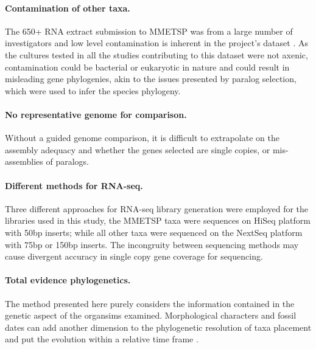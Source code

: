\documentclass[12pt]{article}
\begin{document}
\paragraph*{Contamination of other taxa.} 
The 650+ RNA extract submission to MMETSP was from a large number of investigators and low level contamination is inherent in the project's dataset \cite{keeling2014marine}. 
As the cultures tested in all the studies contributing to this dataset were not axenic, contamination could be bacterial or eukaryotic in nature and could result in misleading gene phylogenies, akin to the issues presented by paralog selection, which were used to infer the species phylogeny.
\paragraph*{No representative genome for comparison.} 
Without a guided genome comparison, it is difficult to extrapolate on the assembly adequacy and whether the genes selected are single copies, or mis-assemblies of paralogs.
\paragraph*{Different methods for RNA-seq.} 
Three different approaches for RNA-seq library generation were employed for the libraries used in this study, the MMETSP taxa were sequences on HiSeq platform with 50bp inserts; while all other taxa were sequenced on the NextSeq platform with 75bp or 150bp inserts. 
The incongruity between sequencing methods may cause divergent accuracy in single copy gene coverage for sequencing.  
\paragraph*{Total evidence phylogenetics.}
The method presented here purely considers the information contained in the genetic aspect of the organsims examined. 
Morphological characters and fossil dates can add another dimension to the phylogenetic resolution of taxa placement and put the evolution within a relative time frame \cite{gavryushkina2017bayesian}.  
\end{document}
